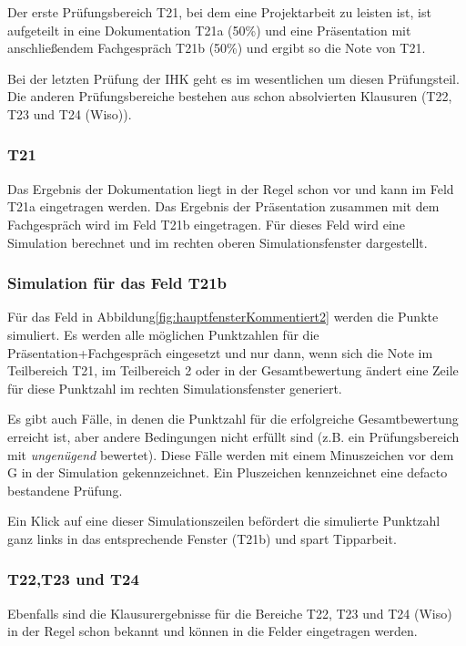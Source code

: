 \documentclass[a4paper,notitlepage,parskip=half]{scrartcl}
\newcommand*\circled[1]{\tikz[baseline=(char.base)]{
            \node[shape=circle,draw,inner sep=2pt] (char) {#1};}}
\begin{document}
Der erste Prüfungsbereich T21, bei dem eine Projektarbeit zu leisten ist, ist aufgeteilt in eine Dokumentation T21a (50\%) und eine Präsentation mit anschließendem Fachgespräch T21b (50\%)  und ergibt so die Note von T21.

Bei der letzten Prüfung der IHK geht es im wesentlichen um diesen Prüfungsteil. Die anderen Prüfungsbereiche bestehen aus schon absolvierten Klausuren (T22, T23 und T24 (Wiso)). 

\subsubsection*{T21}
Das Ergebnis der Dokumentation liegt in der Regel schon vor und kann im Feld T21a eingetragen werden.
Das Ergebnis der Präsentation zusammen mit dem Fachgespräch wird im Feld T21b eingetragen.
Für dieses Feld wird eine Simulation berechnet und im rechten oberen Simulationsfenster dargestellt.

\subsubsection*{Simulation für das Feld T21b}
Für das Feld \circled{1} in Abbildung\ref{fig:hauptfensterKommentiert2} werden die Punkte simuliert.
Es werden alle möglichen Punktzahlen für die Präsentation+Fachgespräch eingesetzt und nur dann, wenn sich die Note im Teilbereich T21, im Teilbereich 2 oder in der Gesamtbewertung ändert eine Zeile für diese Punktzahl im rechten Simulationsfenster generiert. 

Es gibt auch Fälle, in denen die Punktzahl für die erfolgreiche Gesamtbewertung erreicht ist, aber andere Bedingungen nicht erfüllt sind (z.B. ein Prüfungsbereich mit \emph{ungenügend} bewertet). Diese Fälle werden mit einem Minuszeichen vor dem G in der Simulation gekennzeichnet. Ein Pluszeichen kennzeichnet eine defacto bestandene Prüfung.

Ein Klick auf eine dieser Simulationszeilen befördert die simulierte Punktzahl ganz links in das entsprechende Fenster (T21b) und spart Tipparbeit.\marginnote{\textcolor{red}\warning}
 
\subsubsection*{T22,T23 und T24}
Ebenfalls sind die Klausurergebnisse für die Bereiche T22, T23 und T24 (Wiso) in der Regel schon bekannt und können in die Felder eingetragen werden. 
\end{document}
